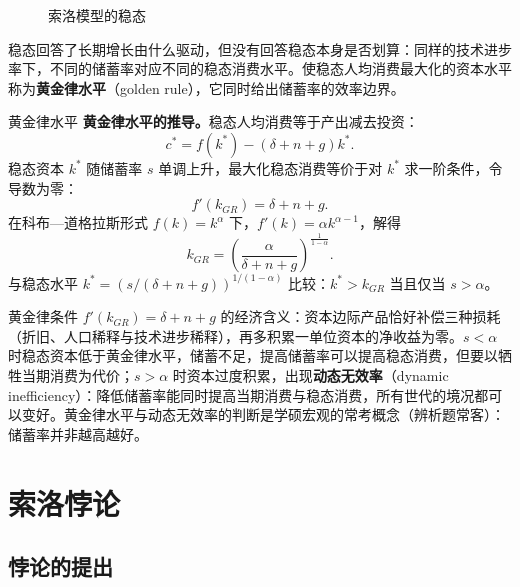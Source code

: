 \begin{figure}[htbp]
\centering
{}
\caption{索洛模型的稳态}
\label{fig:solowphase}
\end{figure}

稳态回答了长期增长由什么驱动，但没有回答稳态本身是否划算：同样的技术进步率下，不同的储蓄率对应不同的稳态消费水平。使稳态人均消费最大化的资本水平称为\textbf{黄金律水平}（golden rule），它同时给出储蓄率的效率边界。

\begin{derivation}{黄金律水平}{}
\textbf{黄金律水平的推导。}稳态人均消费等于产出减去投资：
\[
c^* = f(k^*) - (\delta+n+g)k^*.
\]
稳态资本 $k^*$ 随储蓄率 $s$ 单调上升，最大化稳态消费等价于对 $k^*$ 求一阶条件，令导数为零：
\[
f'(k_{GR}) = \delta+n+g.
\]
在科布—道格拉斯形式 $f(k) = k^\alpha$ 下，$f'(k) = \alpha k^{\alpha-1}$，解得
\[
k_{GR} = \left(\frac{\alpha}{\delta+n+g}\right)^{\frac{1}{1-\alpha}}.
\]
与稳态水平 $k^* = (s/(\delta+n+g))^{1/(1-\alpha)}$ 比较：$k^* > k_{GR}$ 当且仅当 $s > \alpha$。
\end{derivation}

黄金律条件 $f'(k_{GR})=\delta+n+g$ 的经济含义：资本边际产品恰好补偿三种损耗（折旧、人口稀释与技术进步稀释），再多积累一单位资本的净收益为零。$s<\alpha$ 时稳态资本低于黄金律水平，储蓄不足，提高储蓄率可以提高稳态消费，但要以牺牲当期消费为代价；$s>\alpha$ 时资本过度积累，出现\textbf{动态无效率}（dynamic inefficiency）：降低储蓄率能同时提高当期消费与稳态消费，所有世代的境况都可以变好。黄金律水平与动态无效率的判断是学硕宏观的常考概念（辨析题常客）：储蓄率并非越高越好。

\section{索洛悖论}

\subsection{悖论的提出}

